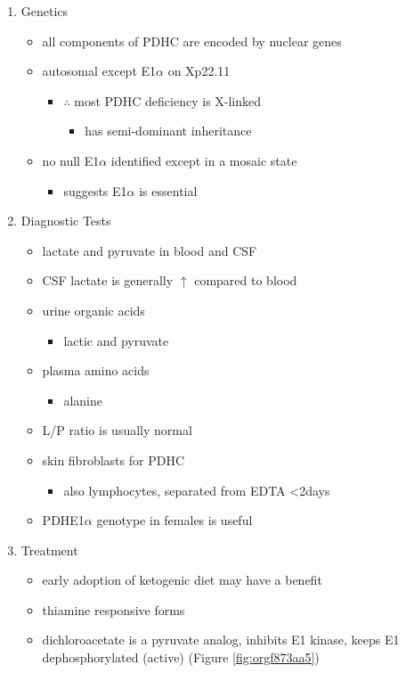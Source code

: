 \documentclass{scrartcl}
\begin{document}
\begin{enumerate}
\item Genetics
\label{sec:orgac5a967}
\begin{itemize}
\item all components of PDHC are encoded by nuclear genes
\item autosomal except E1\(\alpha\) on Xp22.11
\begin{itemize}
\item \(\therefore\) most PDHC deficiency is X-linked
\begin{itemize}
\item has semi-dominant inheritance
\end{itemize}
\end{itemize}
\item no null E1\(\alpha\) identified except in a mosaic state
\begin{itemize}
\item suggests E1\(\alpha\) is essential
\end{itemize}
\end{itemize}

\item Diagnostic Tests
\label{sec:org498825c}
\begin{itemize}
\item lactate and pyruvate in blood and CSF
\item CSF lactate is generally \(\uparrow\) compared to blood
\item urine organic acids
\begin{itemize}
\item lactic and pyruvate
\end{itemize}
\item plasma amino acids
\begin{itemize}
\item alanine
\end{itemize}
\item L/P ratio is usually normal
\item skin fibroblasts for PDHC
\begin{itemize}
\item also lymphocytes, separated from EDTA <2days
\end{itemize}
\item PDHE1\(\alpha\) genotype in females is useful
\end{itemize}

\item Treatment
\label{sec:org84f8265}
\begin{itemize}
\item early adoption of ketogenic diet may have a benefit
\item thiamine responsive forms
\item dichloroacetate is a pyruvate analog, inhibits E1 kinase, keeps E1
dephosphorylated (active) (Figure \ref{fig:orgf873aa5})
\end{itemize}


\end{enumerate}
\end{document}
